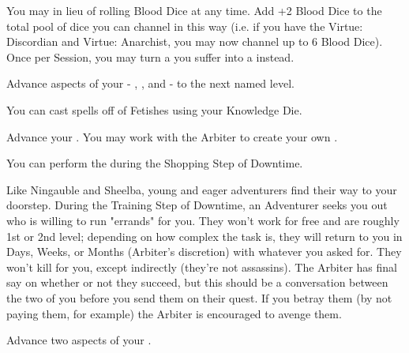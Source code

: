 \begin{multicols*}{2}

You may  in lieu of rolling Blood Dice at any time. Add +2 Blood Dice to the total pool of dice you can channel in this way (i.e. if you have the Virtue: Discordian and Virtue: Anarchist, you may now channel up to 6 Blood Dice). Once per Session, you may turn a  you suffer into a  instead.

\cbreak


Advance  aspects of your  - \DEATH, \INJURY, and \INSANITY - to the next named level.


You can cast spells off of Fetishes using your Knowledge Die.


Advance your \INGENUITY \DCUP. You may work with the Arbiter to create your own .



You can perform the  during the Shopping Step of Downtime. 


Like Ningauble and Sheelba, young and eager adventurers find their way to your doorstep. During the Training Step of Downtime, an Adventurer seeks you out who is willing to run "errands" for you. They won't work for free and are roughly 1st or 2nd level; depending on how complex the task is, they will return to you in Days, Weeks, or Months (Arbiter's discretion) with whatever you asked for. They won't kill for you, except indirectly (they're not assassins). The Arbiter has final say on whether or not they succeed, but this should be a conversation between the two of you before you send them on their quest. If you betray them (by not paying them, for example) the Arbiter is encouraged to avenge them.


Advance two  aspects of your  \DCUP.



\end{multicols*}
